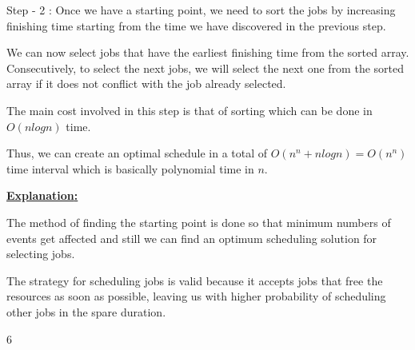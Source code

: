 \documentclass[letterpaper,portrait,12pt]{article}
\begin{document}
\begin{flushleft}
Step - 2 : Once we have a starting point, we need to sort the jobs by increasing finishing time starting from the time we have discovered in the previous step.
\end{flushleft}


\begin{flushleft}

\end{flushleft}


\begin{flushleft}
We can now select jobs that have the earliest finishing time from the sorted array. Consecutively, to select the next jobs, we will select the next one from the sorted array if it does not conflict with the job already selected.
\end{flushleft}


\begin{flushleft}

\end{flushleft}


\begin{flushleft}
The main cost involved in this step is that of sorting which can be done in $O(nlogn)$ time.
\end{flushleft}


\begin{flushleft}

\end{flushleft}


\begin{flushleft}
Thus, we can create an optimal schedule in a total of $O(n^n + nlogn) = O(n^n)$ time interval which is basically polynomial time in $n$.
\end{flushleft}


\begin{flushleft}

\end{flushleft}


\begin{flushleft}
\textbf{\uline{Explanation}}\textbf{\uline{:}}\textbf{\uline{ }}
\end{flushleft}


\begin{flushleft}
The method of finding the starting point is done so that minimum numbers of events get affected and still we can find an optimum scheduling solution for selecting jobs.
\end{flushleft}


\begin{flushleft}
The strategy for scheduling jobs is valid because it accepts jobs that free the resources as soon as possible, leaving us with higher probability of scheduling other jobs in the spare duration.
\end{flushleft}


\begin{flushleft}

\end{flushleft}




6
\end{document}
